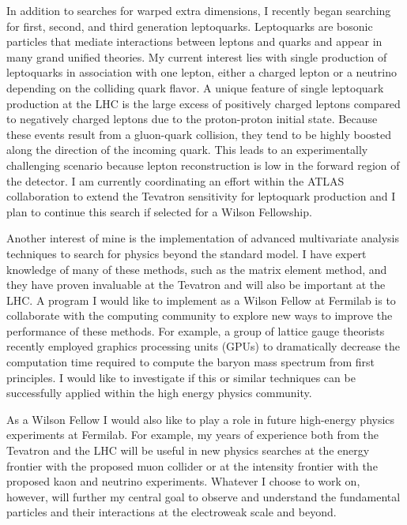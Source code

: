 \documentclass[12pt]{article}
\begin{document}
In addition to searches for warped extra dimensions, I recently began searching for first, second, and third generation leptoquarks. Leptoquarks are bosonic particles that mediate interactions between leptons and quarks and appear in many grand unified theories. My current interest lies with single production of leptoquarks in association with one lepton, either a charged lepton or a neutrino depending on the colliding quark flavor. A unique feature of single leptoquark production at the LHC is the large excess of positively charged leptons compared to negatively charged leptons due to the proton-proton initial state. Because these events result from a gluon-quark collision, they tend to be highly boosted along the direction of the incoming quark. This leads to an experimentally challenging scenario because lepton reconstruction is low in the forward region of the detector. I am currently coordinating an effort within the ATLAS collaboration to extend the Tevatron sensitivity for leptoquark production and I plan to continue this search if selected for a Wilson Fellowship.

Another interest of mine is the implementation of advanced multivariate analysis techniques to search for physics beyond the standard model. I have expert knowledge of many of these methods, such as the matrix element method, and they have proven invaluable at the Tevatron and will also be important at the LHC. A program I would like to implement as a Wilson Fellow at Fermilab is to collaborate with the computing community to explore new ways to improve the performance of these methods. For example, a group of lattice gauge theorists recently employed graphics processing units (GPUs) to dramatically decrease the computation time required to compute the baryon mass spectrum from first principles. I would like to investigate if this or similar techniques can be successfully applied within the high energy physics community.

As a Wilson Fellow I would also like to play a role in future high-energy physics experiments at Fermilab.  For example, my years of experience both from the Tevatron and the LHC will be useful in new physics searches at the energy frontier with the proposed muon collider or at the intensity frontier with the proposed kaon and neutrino experiments.  Whatever I choose to work on, however, will further my central goal to observe and understand the fundamental particles and their interactions at the electroweak scale and beyond.
\end{document}
